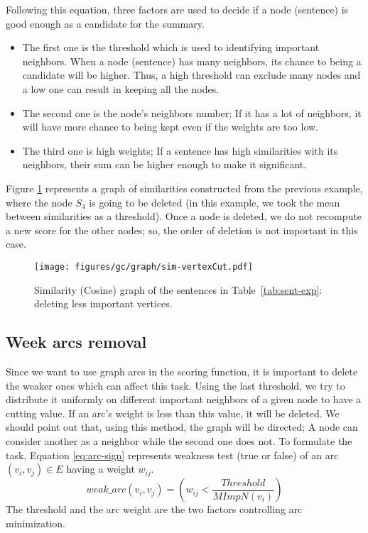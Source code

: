 Following this equation, three factors are used to decide if a node (sentence) is good enough as a candidate for the summary. 
\begin{itemize}
	\item The first one is the threshold which is used to identifying important neighbors. 
	When a node (sentence) has many neighbors, its chance to being a candidate will be higher. 
	Thus, a high threshold can exclude many nodes and a low one can result in keeping all the nodes.
	\item The second one is the node's neighbors number; If it has a lot of neighbors, it will have more chance to being kept even if the weights are too low.
	\item The third one is high weights; If a sentence has high similarities with its neighbors, their sum can be higher enough to make it significant.
\end{itemize}

Figure \ref{fig:vertexCut} represents a graph of similarities constructed from the previous example, where the node $ S_4 $ is going to be deleted (in this example, we took the mean between similarities as a threshold).
Once a node is deleted, we do not recompute a new score for the other nodes; so, the order of deletion is not important in this case.
%
\begin{figure}[ht]
	\centering
	\texttt{[image: figures/gc/graph/sim-vertexCut.pdf]} %
	\caption{Similarity (Cosine) graph of the sentences in Table~\ref{tab:sent-exp}: deleting less important vertices.}
	\label{fig:vertexCut}
\end{figure}

\subsection{Week arcs removal}

Since we want to use graph arcs in the scoring function, it is important to delete the weaker ones which can affect this task. 
Using the last threshold, we try to distribute it uniformly on different important neighbors of a given node to have a cutting value.
If an arc's weight is less than this value, it will be deleted. 
We should point out that, using this method, the graph will be directed; A node can consider another as a neighbor while the second one does not.
To formulate the task, Equation \ref{eq:arc-sign} represents weakness test (true or false) of an arc $ (v_i, v_j) \in E$ having a weight $ w_{ij} $.
\begin{equation}
	weak\_arc(v_i, v_j) = ( w_{ij} < \frac{Threshold}{MImpN(v_i)} )
	\label{eq:arc-sign}
\end{equation}
The threshold and the arc weight are the two factors controlling arc minimization.

